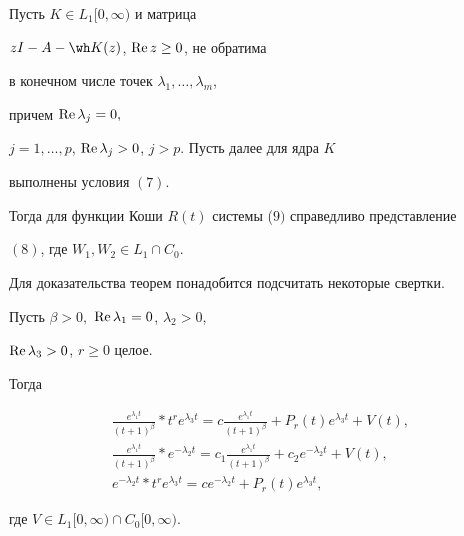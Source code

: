 \begin{thm}


Пусть $K\in L_1[0,\infty)$ и матрица


$zI-A-\wh K(z)$, $\operatorname{Re} z\geq 0$, не обратима


в конечном числе точек $\lambda_1,\dotsc,\lambda_m$,


причем $\operatorname{Re} \lambda_j=0,$


$j=1,\dotsc,p$, $\operatorname{Re} \lambda_j>0$, $j>p.$ Пусть далее для ядра $K$


выполнены условия $(7)$.


Тогда для функции Коши $R(t)$ системы ($9)$ справедливо представление


$(8)$, где $W_1, W_2\in L_1\cap C_0.$


\end{thm}





Для доказательства теорем понадобится подсчитать некоторые свертки.





\begin{lem}


Пусть $\beta >0,$ $\operatorname{Re} \lambda_1=0$, $\lambda_2>0$,


$\operatorname{Re} \lambda_3>0$, $r\geq 0$ целое.


Тогда


\begin{gather*}


\frac{e^{\lambda_1t}}{(t+1)^{\beta}}*t^re^{\lambda_3t}=


c\frac{e^{\lambda_1t}}{(t+1)^{\beta}}


+P_r(t)e^{\lambda_3t}+V(t),\\


\frac{e^{\lambda_1t}}{(t+1)^{\beta}}*e^{-\lambda_2t}=


c_1\frac{e^{\lambda_1t}}{(t+1)^{\beta}}+


c_2e^{-\lambda_2t}+V(t),\\


e^{-\lambda_2t}*t^re^{\lambda_3t}=ce^{-\lambda_2t}+P_r(t)e^{\lambda_3t},


\end{gather*}


где $V\in L_1[0,\infty)\cap C_0[0,\infty).$


\end{lem}






